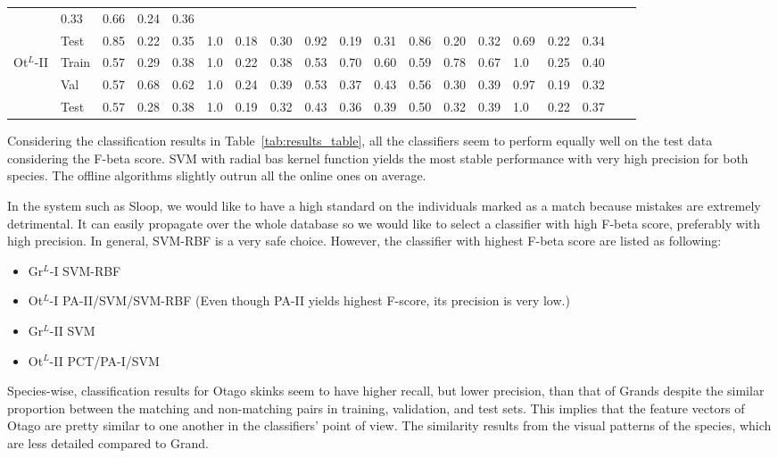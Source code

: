 {\begin{landscape}
\begin{table}
\begin{tabular}{lllll|lll|lll|lll|lllll}
                                       & 0.33 & 0.66 & 0.24 & 0.36     \\
                                       & Test  & 0.85 & 0.22 & 0.35 & 1.0 & 0.18
                                       & 0.30 & 0.92 & 0.19 & 0.31 & 0.86 & 0.20
                                       & 0.32 & 0.69 & 0.22 & 0.34     \\
          \hline
          \multirow{3}{*}{Ot$^{L}$-II} & Train & 0.57 & 0.29 & 0.38 & 1.0 & 0.22
          & 0.38 & 0.53 & 0.70 & 0.60 & 0.59 & 0.78 & 0.67 & 1.0 & 0.25
          & 0.40     \\
                                       & Val  & 0.57 & 0.68 & 0.62 & 1.0 & 0.24
                                       & 0.39 & 0.53 & 0.37 & 0.43 & 0.56 & 0.30
                                       & 0.39 & 0.97 & 0.19 & 0.32   \\
                                       & Test  & 0.57 & 0.28 & 0.38  & 1.0
                                       & 0.19 & 0.32 & 0.43 & 0.36 & 0.39 & 0.50
                                       & 0.32 & 0.39 & 1.0 & 0.22 & 0.37     \\
          \bottomrule
        \end{tabular}
      \end{table}
    \end{landscape}
    \clearpage%
}

Considering the classification results in Table~\ref{tab:results_table}, all the
classifiers seem to perform equally well on the test data considering the
F-beta score. SVM with radial bas kernel function yields the most stable
performance with very high precision for both species. The offline algorithms
slightly outrun all the online ones on average.

In the system such as Sloop, we would like to have a high standard on the
individuals marked as a match because mistakes are extremely detrimental. It
can easily propagate over the whole database so we would like to select a
classifier with high F-beta score, preferably with high precision. In general,
SVM-RBF is a very safe choice. However, the classifier with highest F-beta
score are listed as following:

\begin{itemize}
  \item Gr$^{L}$-I SVM-RBF
  \item Ot$^{L}$-I PA-II/SVM/SVM-RBF (Even though PA-II yields highest F-score,
  its precision is very low.)
  \item Gr$^{L}$-II SVM
  \item Ot$^{L}$-II PCT/PA-I/SVM
\end{itemize}

Species-wise, classification results for Otago skinks seem to have higher
recall, but lower precision, than that of Grands despite the similar proportion
between the matching and non-matching pairs in training, validation, and test
sets. This implies that the feature vectors of Otago are pretty similar to one
another in the classifiers' point of view. The similarity results from the
visual patterns of the species, which are less detailed compared to Grand.
